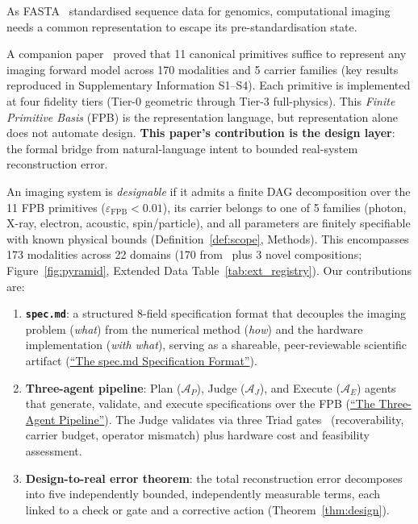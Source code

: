 \documentclass[11pt,a4paper]{article}
\newcommand{\eps}{\varepsilon}
\newcommand{\Agent}{\mathcal{A}}
\begin{document}
As FASTA~\cite{pearson1990fasta} standardised sequence data for genomics, computational imaging needs a common representation to escape its pre-standardisation state.

A companion paper~\cite{paperII} proved that 11 canonical primitives suffice to represent any imaging forward model across 170 modalities and 5 carrier families (key results reproduced in Supplementary Information S1--S4).  Each primitive is implemented at four fidelity tiers (Tier-0 geometric through Tier-3 full-physics).  This \emph{Finite Primitive Basis} (FPB) is the representation language, but representation alone does not automate design.  \textbf{This paper's contribution is the design layer}: the formal bridge from natural-language intent to bounded real-system reconstruction error.

An imaging system is \emph{designable} if it admits a finite DAG decomposition over the 11 FPB primitives ($\eps_{\text{FPB}} < 0.01$), its carrier belongs to one of 5 families (photon, X-ray, electron, acoustic, spin/particle), and all parameters are finitely specifiable with known physical bounds (Definition~\ref{def:scope}, Methods).  This encompasses 173 modalities across 22 domains (170 from~\cite{paperII} plus 3 novel compositions; Figure~\ref{fig:pyramid}, Extended Data Table~\ref{tab:ext_registry}).  Our contributions are:
\begin{enumerate}[nosep]
\item \textbf{\texttt{spec.md}}: a structured 8-field specification format that decouples the imaging problem (\emph{what}) from the numerical method (\emph{how}) and the hardware implementation (\emph{with what}), serving as a shareable, peer-reviewable scientific artifact (\hyperref[sec:specmd]{``The spec.md Specification Format''}).
\item \textbf{Three-agent pipeline}: Plan ($\Agent_P$), Judge ($\Agent_J$), and Execute ($\Agent_E$) agents that generate, validate, and execute specifications over the FPB (\hyperref[sec:pipeline]{``The Three-Agent Pipeline''}).  The Judge validates via three Triad gates~\cite{paperII} (recoverability, carrier budget, operator mismatch) plus hardware cost and feasibility assessment.
\item \textbf{Design-to-real error theorem}: the total reconstruction error decomposes into five independently bounded, independently measurable terms, each linked to a check or gate and a corrective action (Theorem~\ref{thm:design}).
\end{enumerate}
\end{document}
